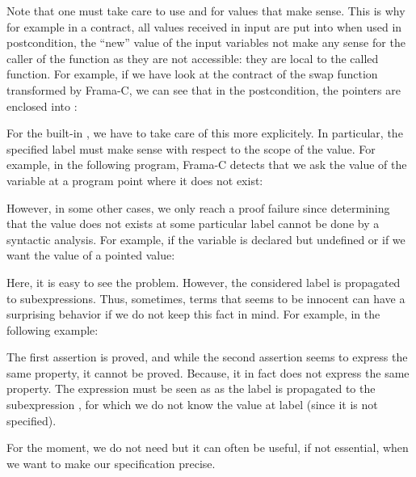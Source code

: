 Note that one must take care to use  and
 for values that make sense. This is why
for example in a contract, all values received in input are put into
 when used in postcondition, the ``new''
value of the input variables not make any sense for the caller of the
function as they are not accessible: they are local to the called function.
For example, if we have look at the contract of the swap function transformed
by Frama-C, we can see that in the postcondition, the pointers are enclosed into
:




For the built-in , we have to take care of this
more explicitely. In particular,
the specified label must make sense with respect to the scope of the
value. For example, in the following program, Frama-C detects that we ask
the value of the variable  at a program point where it does
not exist:






However, in some other cases, we only reach a proof failure since determining
that the value does not exists at some particular label cannot be done by
a syntactic analysis. For example, if the variable is declared but undefined
or if we want the value of a pointed value:




Here, it is easy to see the problem. However, the considered label is
propagated to subexpressions. Thus, sometimes, terms that seems to be
innocent can have a surprising behavior if we do not keep this fact in mind.
For example, in the following example:




The first assertion is proved, and while the second assertion seems to
express the same property, it cannot be proved. Because, it in fact does not
express the same property. The expression
 must be seen as
 as the
label is propagated to the subexpression , for which we do
not know the value at label  (since it is not specified).


For the moment, we do not need  but it can
often be useful, if not essential, when we want to make our
specification precise.



